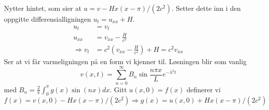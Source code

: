 \documentclass[11pt, a4paper, norsk]{NTNUoving}
\begin{document}
\newpage
\begin{oppgave}[16]
  Nytter hintet, som sier at $u = v - Hx(x-\pi)/(2c^2)$. Setter dette inn i den oppgitte differensialligningen $u_t = u_{xx} + H$.
  \begin{align*}
    u_t &= v_t \\
    u_{xx} &= v_{xx} - \frac{H}{c^2} \\
    \Rightarrow v_t &= c^2\left(v_{xx}-\frac{H}{c^2}\right)+H = c^2 v_{xx}
  \end{align*}
  Ser at vi får varmeligningen på en form vi kjenner til. Løsningen blir som vanlig
  \[
    v(x,t)=\sum_{n=0}^\infty B_n\sin\frac{n\pi x}{L} e^{-\lambda^2t}
  \]
  med $B_n=\frac{2}{\pi}\int_0^\pi g(x)\sin(nx) dx$. Gitt $u(x,0) = f(x)$ definerer vi 
  \[
    f(x) = v(x,0) - Hx(x-\pi)/(2c^2) \Rightarrow g(x) = u(x,0) + Hx(x-\pi)/(2c^2)
  \]
\end{oppgave}
\end{document}
